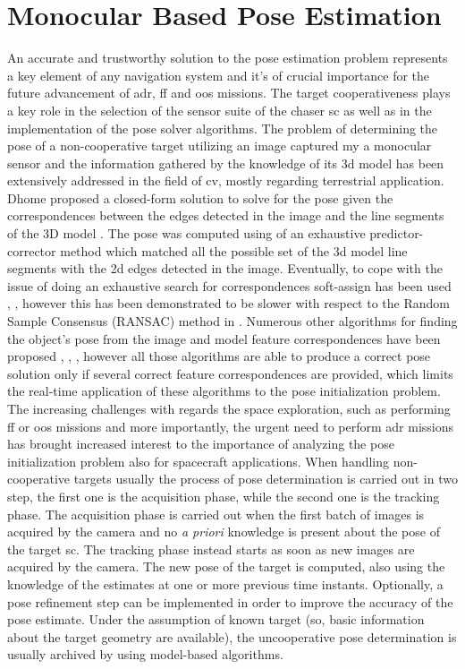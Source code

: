 \newpage

\section{Monocular Based Pose Estimation}
An accurate and trustworthy solution to the pose estimation problem represents a key element of any navigation system and it's of crucial importance for the future advancement of \acrshort{adr}, \acrshort{ff} and \acrshort{oos} missions. The target cooperativeness plays a key role in the selection of the sensor suite of the chaser \acrshort{sc} as well as in the implementation of the pose solver algorithms.
The problem of determining the pose of a non-cooperative target utilizing an image captured my a monocular sensor and the information gathered by the knowledge of its \acrshort{3d} model has been extensively addressed in the field of \acrshort{cv}, mostly regarding terrestrial application. Dhome proposed a closed-form solution to solve for the pose given the correspondences between the edges detected in the image and the line segments of the 3D model \cite{Dhome1989}. The pose was computed using of an exhaustive predictor-corrector method which matched all the possible set of the \acrshort{3d} model line segments with the \acrshort{2d} edges detected in the image. Eventually, to cope with the issue of doing an exhaustive search for correspondences soft-assign has been used \cite{Gold1994}, \cite{David2004}, however this has been demonstrated to be slower with respect to the Random Sample Consensus (RANSAC) method in \cite{Attia2016}. Numerous other algorithms for finding the object's pose from the image and model feature correspondences have been proposed \cite{Mirzaei2011}, \cite{Xu2017}, \cite{10.1007/s11263-008-0152-6}, however all those algorithms are able to produce a correct pose solution only if several correct feature correspondences are provided, which limits the real-time application of these algorithms to the pose initialization problem.
The increasing challenges with regards the space exploration, such as performing \acrshort{ff} or \acrshort{oos} missions and more importantly, the urgent need to perform \acrshort{adr} missions has brought increased interest to the importance of analyzing the pose initialization problem also for spacecraft applications. When handling non-cooperative targets usually the process of pose determination is carried out in two step, the first one is the acquisition phase, while the second one is the tracking phase. The acquisition phase is carried out when the first batch of images is acquired by the camera and no \textit{a priori} knowledge is present about the pose of the target \acrshort{sc}. The tracking phase instead starts as soon as new images are acquired by the camera. The new pose of the target is computed, also using the knowledge of the estimates at one or more previous time instants. Optionally, a pose refinement step can be implemented in order to improve the accuracy of the pose estimate. Under the assumption of known target (so, basic information about the target geometry are available), the uncooperative pose determination is usually archived by using model-based algorithms.
